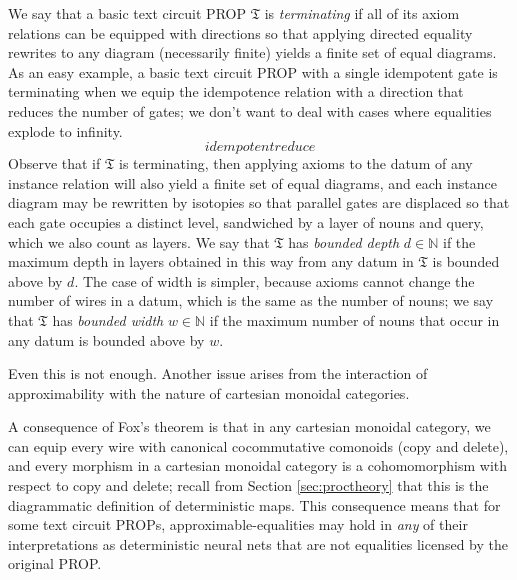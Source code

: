 \begin{fullwidth}
\begin{defn}
We say that a basic text circuit PROP $\mathfrak{T}$ is \emph{terminating} if all of its axiom relations can be equipped with directions so that applying directed equality rewrites to any diagram (necessarily finite) yields a finite set of equal diagrams. As an easy example, a basic text circuit PROP with a single idempotent gate is terminating when we equip the idempotence relation with a direction that reduces the number of gates; we don't want to deal with cases where equalities explode to infinity.
\[idempotentreduce\]
Observe that if $\mathfrak{T}$ is terminating, then applying axioms to the datum of any instance relation will also yield a finite set of equal diagrams, and each instance diagram may be rewritten by isotopies so that parallel gates are displaced so that each gate occupies a distinct level, sandwiched by a layer of nouns and query, which we also count as layers. We say that $\mathfrak{T}$ has \emph{bounded depth} $d \in \mathbb{N}$ if the maximum depth in layers obtained in this way from any datum in $\mathfrak{T}$ is bounded above by $d$. The case of width is simpler, because axioms cannot change the number of wires in a datum, which is the same as the number of nouns; we say that $\mathfrak{T}$ has \emph{bounded width} $w \in \mathbb{N}$ if the maximum number of nouns that occur in any datum is bounded above by $w$.
\end{defn}

Even this is not enough. Another issue arises from the interaction of approximability with the nature of cartesian monoidal categories.

\begin{theorem}

\end{theorem}

A consequence of Fox's theorem is that in any cartesian monoidal category, we can equip every wire with canonical cocommutative comonoids (copy and delete), and every morphism in a cartesian monoidal category is a cohomomorphism with respect to copy and delete; recall from Section \ref{sec:proctheory} that this is the diagrammatic definition of deterministic maps. This consequence means that for some text circuit PROPs, approximable-equalities may hold in \emph{any} of their interpretations as deterministic neural nets that are not equalities licensed by the original PROP.

\begin{example}


\end{example}
\end{fullwidth}
